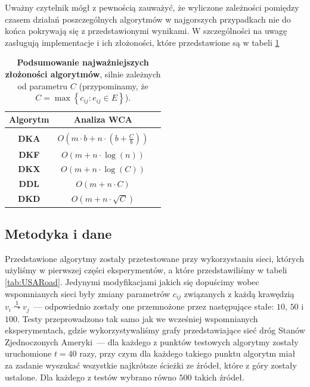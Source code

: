 Uważny czytelnik mógł z pewnością zauważyć, że wyliczone zależności pomiędzy czasem działań poszczególnych algorytmów w najgorszych przypadkach nie do końca pokrywają się z przedstawionymi wynikami. W szczególności na uwagę zasługują implementacje i ich złożoności, które przedstawione są w tabeli \ref{tab:wcaSummary}

\begin{table}[!htbp]
	\centering
	\begin{tabular}{ccc}
		Algorytm & Analiza \textsc{WCA} \\
		\hline \\
		\textbf{DKA} & $ O \left( m \cdot b + n \cdot \left( b + \frac{C}{b}\right)\right)$ \\
		\textbf{DKF} & $ O \left( m + n \cdot \log \left( n \right) \right)$ \\
		\textbf{DKX} & $O \left( m + n \cdot \log \left( C \right) \right)$ \\
		\textbf{DDL} & $O \left( m + n \cdot C  \right)$ \\
		\textbf{DKD} & $O \left( m + n \cdot \sqrt{C} \right)$ \\
		\hline
	\end{tabular}
	\caption{\textbf{Podsumowanie najważniejszych złożoności algorytmów}, silnie zależnych od parametru $C$ (przypominamy, że $ C = \max \left\{ c_{ij} : e_{ij} \in E \right\}$).}
	\label{tab:wcaSummary}
\end{table}

\subsection{Metodyka i dane}

Przedstawione algorytmy zostały przetestowane przy wykorzystaniu sieci, których użyliśmy w pierwszej części eksperymentów, a które przedstawiliśmy w tabeli \ref{tab:USARoad}. Jedynymi modyfikacjami jakich się dopuścimy wobec wspomnianych sieci były zmiany parametrów $c_{ij}$ związanych z każdą krawędzią $v_{i} \overset{1} \leadsto v_{j}$~--- odpowiednio zostały one przemnożone przez następujące stałe: $10$, $50$ i $100$. Testy przeprowadzono tak samo jak we wcześniej wspomnianych eksperymentach, gdzie wykorzystywaliśmy grafy przedstawiające sieć dróg Stanów Zjednoczonych Ameryki~--- dla każdego z punktów testowych algorytmy zostały uruchomione $t = 40$ razy, przy czym dla każdego takiego punktu algorytm miał za zadanie wyszukać wszystkie najkrótsze ścieżki ze źródeł, które z góry zostały ustalone. Dla każdego z testów wybrano równo $500$ takich źródeł.

